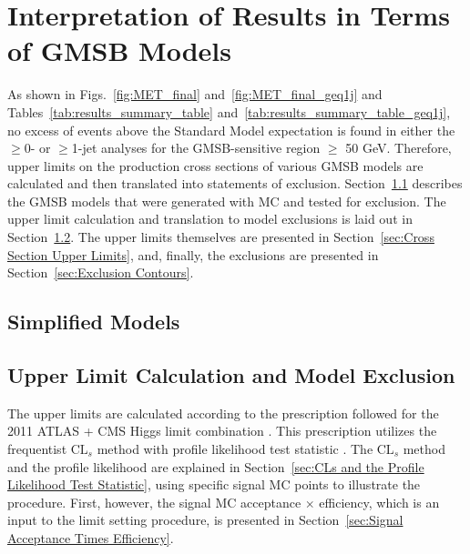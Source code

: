 \documentclass[dissertation.tex]{subfiles}
\begin{document}
\chapter{Interpretation of Results in Terms of GMSB Models}
\label{chap:Interpretation of Results in Terms of GMSB Models}

As shown in Figs.~\ref{fig:MET_final} and~\ref{fig:MET_final_geq1j} and Tables~\ref{tab:results_summary_table} and~\ref{tab:results_summary_table_geq1j}, no excess of events above the Standard Model expectation is found in either the $\geq$0- or $\geq$1-jet analyses for the GMSB-sensitive region \MET $\geq$ 50 GeV.  Therefore, upper limits on the production cross sections of various GMSB models are calculated and then translated into statements of exclusion.  Section~\ref{sec:Simplified Models} describes the GMSB models that were generated with MC and tested for exclusion.  The upper limit calculation and translation to model exclusions is laid out in Section~\ref{sec:Upper Limit Calculation and Model Exclusion}.  The upper limits themselves are presented in Section~\ref{sec:Cross Section Upper Limits}, and, finally, the exclusions are presented in Section~\ref{sec:Exclusion Contours}.

\section{Simplified Models}
\label{sec:Simplified Models}

\section{Upper Limit Calculation and Model Exclusion}
\label{sec:Upper Limit Calculation and Model Exclusion}

The upper limits are calculated according to the prescription followed for the 2011 ATLAS + CMS Higgs limit combination \cite{CMS-NOTE-2011/005}.  This prescription utilizes the frequentist $\mbox{CL}_{s}$ method \cite{Read} with profile likelihood test statistic \cite{Cowan_Cranmer_Gross_Vitells}.  The $\mbox{CL}_{s}$ method and the profile likelihood are explained in Section~\ref{sec:CLs and the Profile Likelihood Test Statistic}, using specific signal MC points to illustrate the procedure.  First, however, the signal MC acceptance $\times$ efficiency, which is an input to the limit setting procedure, is presented in Section~\ref{sec:Signal Acceptance Times Efficiency}.
\end{document}
